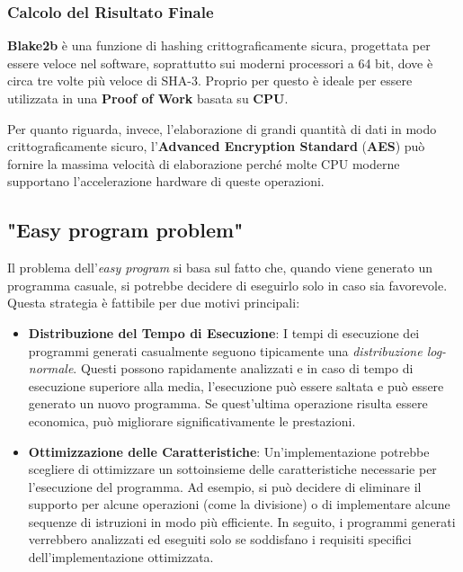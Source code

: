 \subsubsection{Calcolo del Risultato Finale}
\textbf{Blake2b} è una funzione di hashing crittograficamente sicura, progettata per essere veloce nel software, soprattutto sui moderni processori a 64 bit, dove è circa tre volte più veloce di SHA-3. Proprio per questo è ideale per essere utilizzata in una \textbf{Proof of Work} basata su \textbf{CPU}.

Per quanto riguarda, invece, l'elaborazione di grandi quantità di dati in modo crittograficamente sicuro, l'\textbf{Advanced Encryption Standard }(\textbf{AES}) può fornire la massima velocità di elaborazione perché molte CPU moderne supportano l'accelerazione hardware di queste operazioni.

\subsection{"Easy program problem"}
Il problema dell'\textit{easy program} si basa sul fatto che, quando viene generato un programma casuale, si potrebbe decidere di eseguirlo solo in caso sia favorevole. Questa strategia è fattibile per due motivi principali:

\begin{itemize}
    \item \textbf{Distribuzione del Tempo di Esecuzione}: I tempi di esecuzione dei programmi generati casualmente seguono tipicamente una \textit{distribuzione log-normale}. Questi possono rapidamente analizzati e in caso di tempo di esecuzione superiore alla media, l'esecuzione può essere saltata e può essere generato un nuovo programma. Se quest'ultima operazione risulta essere economica, può migliorare significativamente le prestazioni.
    \item \textbf{Ottimizzazione delle Caratteristiche}: Un'implementazione potrebbe scegliere di ottimizzare un sottoinsieme delle caratteristiche necessarie per l'esecuzione del programma. Ad esempio, si può decidere di eliminare il supporto per alcune operazioni (come la divisione) o di implementare alcune sequenze di istruzioni in modo più efficiente. In seguito, i programmi generati verrebbero analizzati ed eseguiti solo se soddisfano i requisiti specifici dell'implementazione ottimizzata.
\end{itemize}

